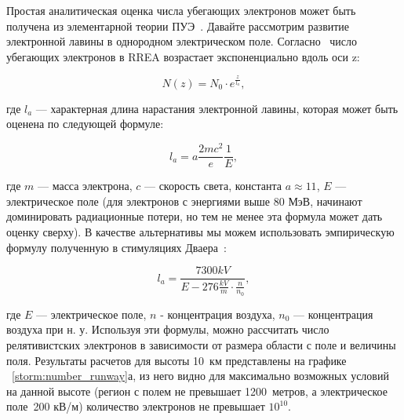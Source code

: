 Простая аналитическая оценка числа убегающих электронов может быть получена из элементарной теории ПУЭ~\cite{Gurevich2001ufn}. Давайте рассмотрим развитие электронной лавины в однородном электрическом поле. Согласно~\cite{Gurevich2001ufn} число убегающих электронов в RREA возрастает экспоненциально вдоль оси z:

\begin{equation}
\label{storm:exp}
N(z) = N_0 \cdot e^{\frac{z}{l_a}},
\end{equation}

где $l_a$ --- характерная длина нарастания электронной лавины, которая может быть оценена по следующей формуле:

\begin{equation}
l_a = a\frac{2 m c^{2}}{e} \frac{1}{E},
\end{equation}

где $m$ --- масса электрона, $c$ --- скорость света, константа $a \approx 11$, $E$ --- электрическое поле (для электронов с энергиями выше 80 МэВ, начинают доминировать радиационные потери, но тем не менее эта формула может дать оценку сверху). В качестве альтернативы мы можем использовать эмпирическую формулу полученную в стимуляциях Дваера~\cite{Dwyer2007}:

\begin{equation}
\label{storm:dwyer}
l_a = \frac{7300 kV}{E - 276 \frac{kV}{m} \cdot \frac{n}{n_0}},
\end{equation}

где $E$ --- электрическое поле, $n$ - концентрация воздуха, $n_0$ --- концентрация воздуха при н. у. Используя эти формулы, можно рассчитать число релятивистских электронов в зависимости от размера области с поле и величины поля. Результаты расчетов для высоты 10~км представлены на графике ~\ref{storm:number_runway}а, из него видно для максимально возможных условий на данной высоте (регион с полем не превышает 1200~метров, а электрическое поле~200 кВ/м) количество электронов не превышает $10^{10}$.


